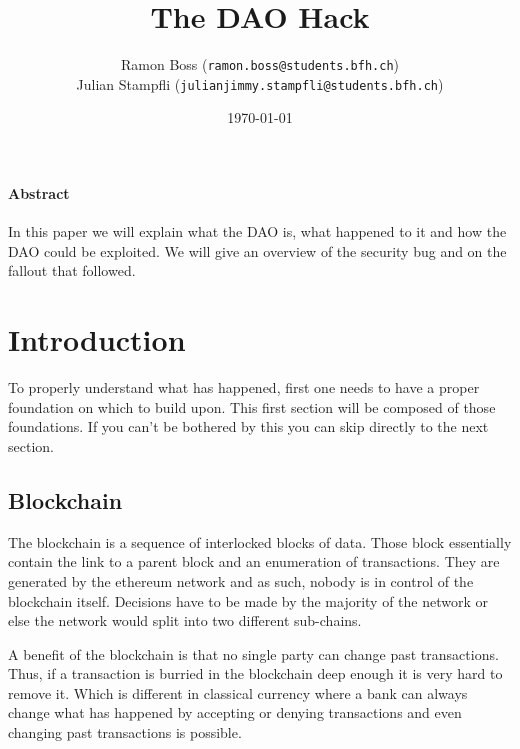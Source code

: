 \documentclass[a4paper, 11pt]{scrartcl}
\begin{document}
\title{The DAO Hack}
\date{\today}   %
\author{
  Ramon Boss (\texttt{ramon.boss@students.bfh.ch}) \\
  Julian Stampfli (\texttt{julianjimmy.stampfli@students.bfh.ch})
}

\maketitle

\paragraph{Abstract}

In this paper we will explain what the DAO is, what happened to it and how the DAO could be exploited.
We will give an overview of the security bug and on the fallout that followed.

\setcounter{tocdepth}{2}
\tableofcontents
\clearpage

\section{Introduction}

To properly understand what has happened, first one needs to have a proper foundation on which to build upon.
This first section will be composed of those foundations.
If you can't be bothered by this you can skip directly to the next section.

\subsection{Blockchain}

The blockchain is a sequence of interlocked blocks of data.
Those block essentially contain the link to a parent block and an enumeration of transactions.
They are generated by the ethereum network and as such, nobody is in control of the blockchain itself.
Decisions have to be made by the majority of the network or else the network would split into two different sub-chains. \cite{blockchainKai}

A benefit of the blockchain is that no single party can change past transactions.
Thus, if a transaction is burried in the blockchain deep enough it is very hard to remove it. Which is different in classical currency where a bank can always change what has happened by accepting or denying transactions and even changing past transactions is possible. \cite{blockchainKai}
\end{document}
